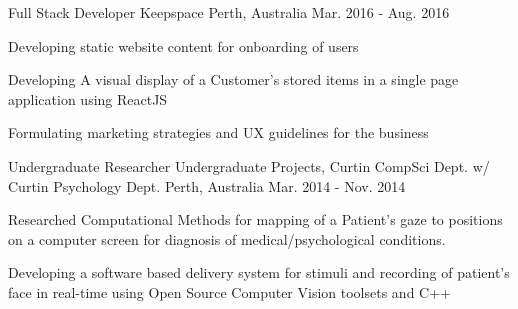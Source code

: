 \begin{cventries}
  \cventry
    {Full Stack Developer} %
    {Keepspace} %
    {Perth, Australia} %
    {Mar. 2016 - Aug. 2016} %
    {
      \begin{cvitems} %
        \item {Developing static website content for onboarding of users}
        \item {Developing A visual display of a Customer’s stored items in a single page application using ReactJS }
        \item {Formulating marketing strategies and UX guidelines for the business}
      \end{cvitems}
    }


\cventry
    {Undergraduate Researcher} %
    {Undergraduate Projects, Curtin CompSci Dept. w/ Curtin Psychology Dept.} %
    {Perth, Australia} %
    {Mar. 2014 - Nov. 2014} %
    {
      \begin{cvitems} %
        \item {Researched Computational Methods for mapping of a Patient’s gaze to positions on a computer screen for diagnosis of medical/psychological conditions.}
        \item {Developing a software based delivery system for stimuli and recording of patient’s face in real-time using Open Source Computer Vision toolsets and C++}
      \end{cvitems}
    }

\end{cventries}
